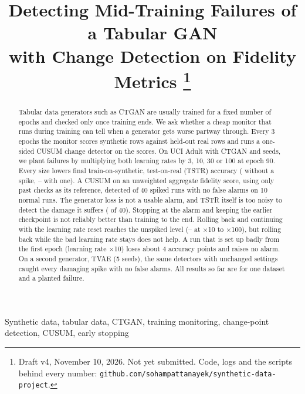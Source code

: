 \documentclass[conference]{IEEEtran}
\newcommand{\x}{$\times$}
\begin{document}
\title{Detecting Mid-Training Failures of a Tabular GAN\\with Change Detection on Fidelity Metrics%
\thanks{Draft v4, November 10, 2026. Not yet submitted. Code, logs and the
scripts behind every number: \texttt{github.com/sohampattanayek/synthetic-data-project}.}}

\author{
}

\maketitle

\begin{abstract}
Tabular data generators such as CTGAN are usually trained for a fixed number
of epochs and checked only once training ends. We ask whether a cheap monitor
that runs during training can tell when a generator gets worse partway
through. Every 3 epochs the monitor scores synthetic rows against held-out
real rows and runs a one-sided CUSUM change detector on the scores. On UCI
Adult with CTGAN and \nSeeds{} seeds, we plant failures by multiplying both
learning rates by 3, 10, 30 or 100 at epoch 90. Every size lowers final
train-on-synthetic, test-on-real (TSTR) accuracy (\dmgCtrl{} without a spike,
\dmgHundred--\dmgThree{} with one). A CUSUM on an unweighted aggregate
fidelity score, using only past checks as its reference, detected
\scoreExpDet{} of 40 spiked runs with no false alarms on 10 normal runs. The
generator loss is not a usable alarm, and TSTR itself is too noisy to detect
the damage it suffers (\tstrDet{} of 40). Stopping at the alarm and keeping
the earlier checkpoint is not reliably better than training to the end.
Rolling back and continuing with the learning rate reset reaches the
unspiked level (\rbLow--\rbHigh{} at \x10 to \x100), but rolling back while
the bad learning rate stays does not help. A run that is set up badly from
the first epoch (learning rate \x10) loses about 4 accuracy points and
raises no alarm. On a second generator, TVAE (5 seeds), the same detectors
with unchanged settings caught every damaging spike with no false alarms.
All results so far are for one dataset and a planted failure.
\end{abstract}

\begin{IEEEkeywords}
Synthetic data, tabular data, CTGAN, training monitoring, change-point
detection, CUSUM, early stopping
\end{IEEEkeywords}
\end{document}

